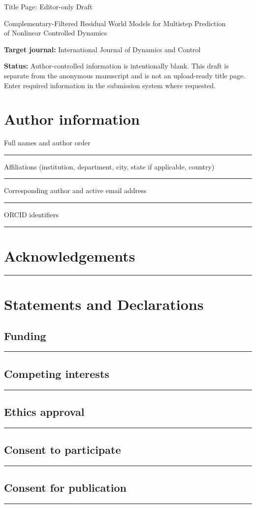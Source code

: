 \documentclass[11pt]{article}
\newcommand{\blankfield}{\par\noindent\rule{\linewidth}{0.3pt}\par\medskip}
\begin{document}
\begin{center}
{\Large Title Page: Editor-only Draft}\par\medskip
{\large Complementary-Filtered Residual World Models for Multistep Prediction\\
of Nonlinear Controlled Dynamics}
\end{center}
\noindent\textbf{Target journal:} International Journal of Dynamics and Control

\noindent\textbf{Status:} Author-controlled information is intentionally blank.
This draft is separate from the anonymous manuscript and is not an upload-ready
title page. Enter required information in the submission system where requested.

\section*{Author information}
\noindent Full names and author order\blankfield
\noindent Affiliations (institution, department, city, state if applicable, country)\blankfield
\noindent Corresponding author and active email address\blankfield
\noindent ORCID identifiers\blankfield

\section*{Acknowledgements}
\blankfield

\section*{Statements and Declarations}
\subsection*{Funding}
\blankfield
\subsection*{Competing interests}
\blankfield
\subsection*{Ethics approval}
\blankfield
\subsection*{Consent to participate}
\blankfield
\subsection*{Consent for publication}
\blankfield
\end{document}
